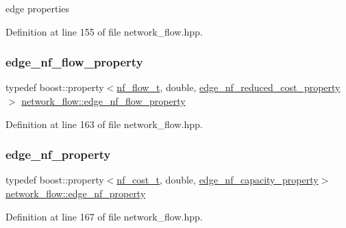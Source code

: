 edge properties 



Definition at line 155 of file network\+\_\+flow.\+hpp.

\mbox{\label{classnetwork__flow_a7ff9c3dbfcecece654db838d75aaea91}} 
\subsubsection{\texorpdfstring{edge\+\_\+nf\+\_\+flow\+\_\+property}{edge\_nf\_flow\_property}}
{\footnotesize\ttfamily typedef boost\+::property$<$\hyperlink{structnetwork__flow_1_1nf__flow__t}{nf\+\_\+flow\+\_\+t}, double, \hyperlink{classnetwork__flow_ad30465332300f2ca2c25289cc0548e17}{edge\+\_\+nf\+\_\+reduced\+\_\+cost\+\_\+property}$>$ \hyperlink{classnetwork__flow_a7ff9c3dbfcecece654db838d75aaea91}{network\+\_\+flow\+::edge\+\_\+nf\+\_\+flow\+\_\+property}\hspace{0.3cm}{\ttfamily [private]}}



Definition at line 163 of file network\+\_\+flow.\+hpp.

\mbox{\label{classnetwork__flow_a09cdef033c08baeb9ef03c21f0a5947d}} 
\subsubsection{\texorpdfstring{edge\+\_\+nf\+\_\+property}{edge\_nf\_property}}
{\footnotesize\ttfamily typedef boost\+::property$<$\hyperlink{structnetwork__flow_1_1nf__cost__t}{nf\+\_\+cost\+\_\+t}, double, \hyperlink{classnetwork__flow_a94cd5febfd01e9a9d40fec1ce816632a}{edge\+\_\+nf\+\_\+capacity\+\_\+property}$>$ \hyperlink{classnetwork__flow_a09cdef033c08baeb9ef03c21f0a5947d}{network\+\_\+flow\+::edge\+\_\+nf\+\_\+property}\hspace{0.3cm}{\ttfamily [private]}}



Definition at line 167 of file network\+\_\+flow.\+hpp.

